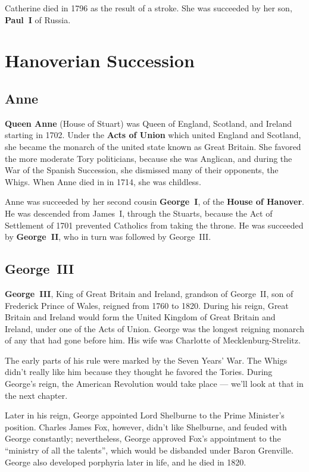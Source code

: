 Catherine died in 1796 as the result of a stroke.
She was succeeded by her son, \textbf{Paul~I} of Russia.

\section{Hanoverian Succession}

\subsection*{Anne}

\textbf{Queen Anne} (House of Stuart) was Queen of England, Scotland, and Ireland starting in 1702.
Under the \textbf{Acts of Union} which united England and Scotland,
she became the monarch of the united state known as Great Britain.
She favored the more moderate Tory politicians, because she was Anglican,
and during the War of the Spanish Succession, she dismissed many of their opponents, the Whigs.
When Anne died in in 1714, she was childless.

Anne was succeeded by her second cousin \textbf{George~I}, of the \textbf{House of Hanover}.
He was descended from James~I, through the Stuarts,
because the Act of Settlement of 1701 prevented Catholics from taking the throne.
He was succeeded by \textbf{George~II}, who in turn was followed by George~III\@.


\subsection*{George~III}

\textbf{George~III}, King of Great Britain and Ireland, grandson of George~II, son of Frederick Prince of Wales,
reigned from 1760 to 1820.
During his reign, Great Britain and Ireland would form the United Kingdom of Great Britain and Ireland,
under one of the Acts of Union.
George was the longest reigning monarch of any that had gone before him.
His wife was Charlotte of Mecklenburg-Strelitz.

The early parts of his rule were marked by the Seven Years' War.
The Whigs didn't really like him because they thought he favored the Tories.
During George's reign, the American Revolution would take place --- we'll look at that in the next chapter.

Later in his reign, George appointed Lord Shelburne to the Prime Minister's position.
Charles James Fox, however, didn't like Shelburne, and feuded with George constantly;
nevertheless, George approved Fox's appointment to the ``ministry of all the talents'',
which would be disbanded under Baron Grenville.
George also developed porphyria later in life, and he died in 1820.
